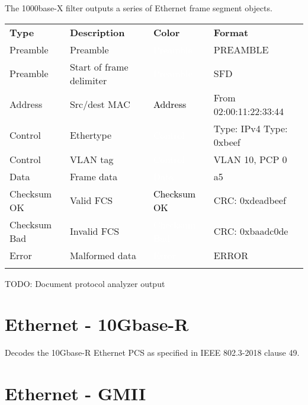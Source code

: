 The 1000base-X filter outputs a series of Ethernet frame segment objects.

\begin{tabularx}{16cm}{lllX}
\thickhline
\textbf{Type} & \textbf{Description} & \textbf{Color} & \textbf{Format} \\
\thickhline
Preamble & Preamble & \cellcolor{preamble}\textcolor{white}{Preamble} & PREAMBLE \\
\thinhline
Preamble & Start of frame delimiter & \cellcolor{preamble}\textcolor{white}{Preamble} & SFD \\
\thinhline
Address & Src/dest MAC & \cellcolor{address}\textcolor{black}{Address} & From 02:00:11:22:33:44 \\
\thinhline
Control & Ethertype & \cellcolor{control}\textcolor{white}{Control} & Type: IPv4 \newline Type: 0xbeef \\
\thinhline
Control & VLAN tag & \cellcolor{control}\textcolor{white}{Control} & VLAN 10, PCP 0 \\
\thinhline
Data & Frame data & \cellcolor{data}\textcolor{white}{Data} & a5 \\
\thinhline
Checksum OK & Valid FCS & \cellcolor{checksumok}\textcolor{black}{Checksum OK} & CRC: 0xdeadbeef \\
\thinhline
Checksum Bad & Invalid FCS & \cellcolor{checksumbad}\textcolor{white}{Checksum Bad} & CRC: 0xbaadc0de \\
\thinhline
Error & Malformed data & \cellcolor{error}\textcolor{white}{Error} & ERROR \\
\thickhline
\end{tabularx}

TODO: Document protocol analyzer output

\pagebreak
\section{Ethernet - 10Gbase-R}
\label{filter:10gbaser}

Decodes the 10Gbase-R Ethernet PCS as specified in IEEE 802.3-2018 clause 49.

\pagebreak
\section{Ethernet - GMII}

